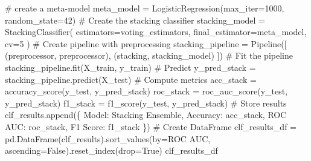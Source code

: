 \documentclass[
  letterpaper,
  DIV=11,
  numbers=noendperiod]{scrreprt}
\newenvironment{Shaded}{\begin{snugshade}}{\end{snugshade}}
\newcommand{\CommentTok}[1]{\textcolor[rgb]{0.37,0.37,0.37}{#1}}
\newcommand{\DecValTok}[1]{\textcolor[rgb]{0.68,0.00,0.00}{#1}}
\newcommand{\NormalTok}[1]{\textcolor[rgb]{0.00,0.23,0.31}{#1}}
\newcommand{\OperatorTok}[1]{\textcolor[rgb]{0.37,0.37,0.37}{#1}}
\newcommand{\StringTok}[1]{\textcolor[rgb]{0.13,0.47,0.30}{#1}}
\newcommand{\VariableTok}[1]{\textcolor[rgb]{0.07,0.07,0.07}{#1}}
\begin{document}
\begin{Shaded}
\begin{Highlighting}[]
\CommentTok{\# create a meta{-}model}
\NormalTok{meta\_model }\OperatorTok{=}\NormalTok{ LogisticRegression(max\_iter}\OperatorTok{=}\DecValTok{1000}\NormalTok{, random\_state}\OperatorTok{=}\DecValTok{42}\NormalTok{)}
\CommentTok{\# Create the stacking classifier    }
\NormalTok{stacking\_model }\OperatorTok{=}\NormalTok{ StackingClassifier(}
\NormalTok{    estimators}\OperatorTok{=}\NormalTok{voting\_estimators,}
\NormalTok{    final\_estimator}\OperatorTok{=}\NormalTok{meta\_model,}
\NormalTok{    cv}\OperatorTok{=}\DecValTok{5}
\NormalTok{)}
\CommentTok{\# Create pipeline with preprocessing}
\NormalTok{stacking\_pipeline }\OperatorTok{=}\NormalTok{ Pipeline([}
\NormalTok{    (}\StringTok{\textquotesingle{}preprocessor\textquotesingle{}}\NormalTok{, preprocessor),}
\NormalTok{    (}\StringTok{\textquotesingle{}stacking\textquotesingle{}}\NormalTok{, stacking\_model)}
\NormalTok{])}
\CommentTok{\# Fit the pipeline}
\NormalTok{stacking\_pipeline.fit(X\_train, y\_train)}
\CommentTok{\# Predict}
\NormalTok{y\_pred\_stack }\OperatorTok{=}\NormalTok{ stacking\_pipeline.predict(X\_test)}
\CommentTok{\# Compute metrics}
\NormalTok{acc\_stack }\OperatorTok{=}\NormalTok{ accuracy\_score(y\_test, y\_pred\_stack)}
\NormalTok{roc\_stack }\OperatorTok{=}\NormalTok{ roc\_auc\_score(y\_test, y\_pred\_stack)}
\NormalTok{f1\_stack }\OperatorTok{=}\NormalTok{ f1\_score(y\_test, y\_pred\_stack)}
\CommentTok{\# Store results}
\NormalTok{clf\_results.append(\{}
    \StringTok{\textquotesingle{}Model\textquotesingle{}}\NormalTok{: }\StringTok{\textquotesingle{}Stacking Ensemble\textquotesingle{}}\NormalTok{,}
    \StringTok{\textquotesingle{}Accuracy\textquotesingle{}}\NormalTok{: acc\_stack,}
    \StringTok{\textquotesingle{}ROC AUC\textquotesingle{}}\NormalTok{: roc\_stack,}
    \StringTok{\textquotesingle{}F1 Score\textquotesingle{}}\NormalTok{: f1\_stack}
\NormalTok{\})}
\CommentTok{\# Create DataFrame}
\NormalTok{clf\_results\_df }\OperatorTok{=}\NormalTok{ pd.DataFrame(clf\_results).sort\_values(by}\OperatorTok{=}\StringTok{\textquotesingle{}ROC AUC\textquotesingle{}}\NormalTok{, ascending}\OperatorTok{=}\VariableTok{False}\NormalTok{).reset\_index(drop}\OperatorTok{=}\VariableTok{True}\NormalTok{)}
\NormalTok{clf\_results\_df}

\end{Highlighting}
\end{Shaded}
\end{document}
